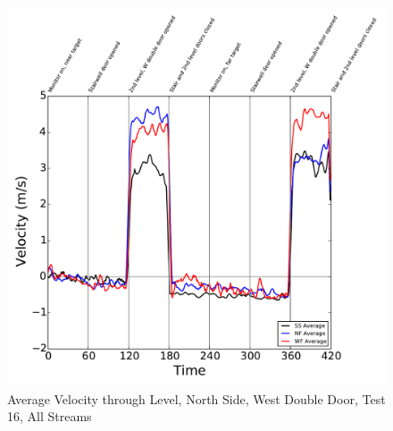 \documentclass[12pt,oneside]{book}
\begin{document}
\begin{figure}[!ht]
\includegraphics[width=6in]{../../../Figures/Hose_Test_Figures/Test_16_West_063014_custom_BDP_A13_Avg}
\caption{Average Velocity through  Level, North Side, West Double Door, Test 16, All Streams}
\label{fig:Test_16_BDP_A13_Avg_All}
\end{figure}

\clearpage



\end{document}
